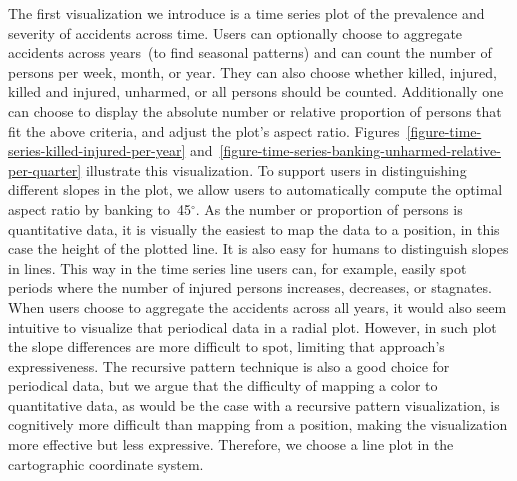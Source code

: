 The first visualization we introduce is a time series plot of the prevalence and severity of accidents across time.
Users can optionally choose to aggregate accidents across years~(to find seasonal patterns) and can count the number of persons per week, month, or year. They can also choose whether killed, injured, killed and injured, unharmed, or all persons should be counted. Additionally one can choose to display the absolute number or relative proportion of persons that fit the above criteria, and adjust the plot's aspect ratio.
Figures~\ref{figure-time-series-killed-injured-per-year} and~\ref{figure-time-series-banking-unharmed-relative-per-quarter} illustrate this visualization.
To support users in distinguishing different slopes in the plot, we allow users to automatically compute the optimal aspect ratio by banking to~45\(^\circ\).
As the number or proportion of persons is quantitative data, it is visually the easiest to map the data to a position, in this case the height of the plotted line. It is also easy for humans to distinguish slopes in lines. This way in the time series line users can, for example, easily spot periods where the number of injured persons increases, decreases, or stagnates.
When users choose to aggregate the accidents across all years, it would also seem intuitive to visualize that periodical data in a radial plot. However, in such plot the slope differences are more difficult to spot, limiting that approach's expressiveness. The recursive pattern technique is also a good choice for periodical data, but we argue that the difficulty of mapping a color to quantitative data, as would be the case with a recursive pattern visualization, is cognitively more difficult than mapping from a position, making the visualization more effective but less expressive. Therefore, we choose a line plot in the cartographic coordinate system.

